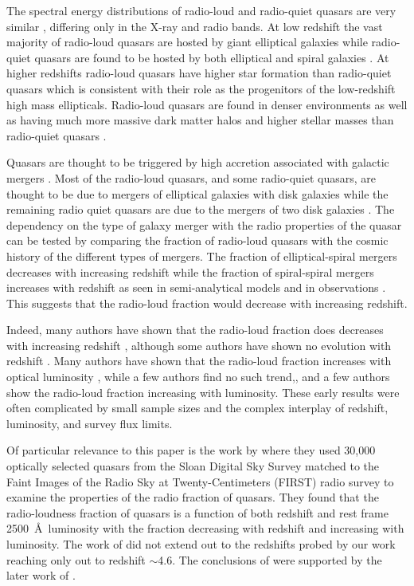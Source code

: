 \documentclass[a4paper,fleqn,usenatbib]{mnras}
\newcommand{\around}{$\sim$}
\begin{document}
The spectral energy distributions of radio-loud and radio-quiet quasars are very similar \citep{elvis94,richards06,devries06,shang11,shankar16}, {differing} only in the X-ray  and  radio bands.    At low redshift the vast majority of radio-loud quasars are hosted by giant elliptical galaxies while radio-quiet quasars are found to be hosted by both elliptical and spiral galaxies \citep{floyd10,tadhunter16,rusinek20}.  At higher redshifts radio-loud quasars have higher star formation than radio-quiet quasars \citep{kalfountzou12} which is consistent with their role as the progenitors of the low-redshift high mass ellipticals.  Radio-loud quasars are found in denser environments as well as having much more massive dark matter halos and higher stellar masses than radio-quiet quasars  \citep{mandelbaum09,shen09,donoso10,wylezalek13,rees16,retanamontenegro17}.

Quasars are thought to be triggered by high accretion associated with galactic mergers \citep{hopkins06}.  Most of the radio-loud quasars, and some  radio-quiet quasars, are thought {to be} due to mergers of elliptical galaxies with disk galaxies while the remaining radio quiet quasars are due to the mergers of two disk galaxies \citep{shen09,bessiere12,treister12}.  The dependency on the type of galaxy merger with the radio properties of the quasar can be tested by comparing the fraction of radio-loud quasars with the cosmic history of the different types of mergers.  The fraction of elliptical-spiral mergers decreases with increasing redshift while the fraction of spiral-spiral mergers increases with redshift as seen in semi-analytical models \citep{khochfar03} and in observations \citep{lin08}.  This suggests that the radio-loud fraction would decrease with increasing redshift.

Indeed, many authors have shown that the radio-loud fraction does decreases with increasing redshift \citep{peacock86,miller90,schneider92,visnovsky92,lafranca94}, although  some authors have shown no evolution with redshift \citep{goldschmidt99,stern00,ivezic02}.  Many authors have shown that the radio-loud fraction increases with optical luminosity \citep{visnovsky92,padovani93,goldschmidt99}, while a few authors find no such trend,\citep{stern00,ivezic02}, and a few authors show  the radio-loud fraction increasing with luminosity\citep{hooper95,bischof97}. {These early results were often complicated by small sample sizes and the complex interplay of redshift, luminosity, and survey flux limits.}

{Of particular relevance to this paper is the work by \citet{jiang07} where they used 30,000 optically selected quasars from the Sloan Digital Sky Survey matched to the Faint Images of the Radio Sky at Twenty-Centimeters (FIRST) radio survey to examine the properties of the radio fraction of quasars.  They found that the radio-loudness fraction of quasars is a function of both redshift and rest frame 2500~\AA\ luminosity with the fraction decreasing with redshift and increasing with luminosity.  The work of \citet{jiang07} did not extend out to the redshifts probed by our work reaching only out to redshift \around 4.6. The conclusions of \citet{jiang07} were supported by the later work of \citet{kratzer15,rusinekabarca21}.}
\end{document}
